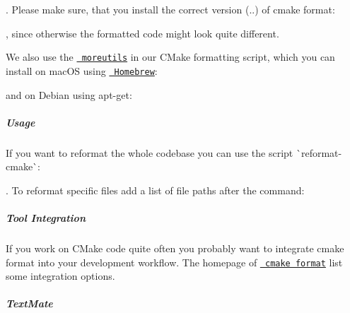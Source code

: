 . Please make sure, that you install the correct version ({..}) of cmake format\+:


\begin{DoxyCode}{0}
\end{DoxyCode}


, since otherwise the formatted code might look quite different.

We also use the \href{https://joeyh.name/code/moreutils}{\texttt{ moreutils}} in our C\+Make formatting script, which you can install on mac\+OS using \href{https://brew.sh}{\texttt{ Homebrew}}\+:


\begin{DoxyCode}{0}
\end{DoxyCode}


and on Debian using {\ttfamily apt-\/get}\+:


\begin{DoxyCode}{0}
\end{DoxyCode}


\label{doc_CODING_md_autotoc_md991}%
%
\subparagraph*{Usage}

If you want to reformat the whole codebase you can use the script \`{}reformat-\/cmake\`{}\+:


\begin{DoxyCode}{0}
\end{DoxyCode}


. To reformat specific files add a list of file paths after the command\+:


\begin{DoxyCode}{0}
\end{DoxyCode}


\label{doc_CODING_md_autotoc_md992}%
%
\subparagraph*{Tool Integration}

If you work on C\+Make code quite often you probably want to integrate cmake format into your development workflow. The homepage of \href{https://github.com/cheshirekow/cmake_format\#integrations}{\texttt{ cmake format}} list some integration options.

\subparagraph*{Text\+Mate}

